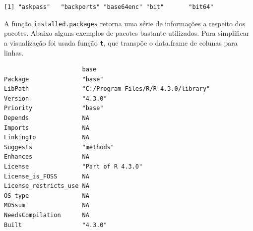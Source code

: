 \documentclass[
  letterpaper,
  DIV=11,
  numbers=noendperiod]{scrreprt}
\newenvironment{Shaded}{\begin{snugshade}}{\end{snugshade}}
\newcommand{\CommentTok}[1]{\textcolor[rgb]{0.37,0.37,0.37}{#1}}
\newcommand{\FunctionTok}[1]{\textcolor[rgb]{0.28,0.35,0.67}{#1}}
\newcommand{\NormalTok}[1]{\textcolor[rgb]{0.00,0.23,0.31}{#1}}
\newcommand{\OtherTok}[1]{\textcolor[rgb]{0.00,0.23,0.31}{#1}}
\newcommand{\SpecialCharTok}[1]{\textcolor[rgb]{0.37,0.37,0.37}{#1}}
\newcommand{\StringTok}[1]{\textcolor[rgb]{0.13,0.47,0.30}{#1}}
\begin{document}
\begin{verbatim}
[1] "askpass"   "backports" "base64enc" "bit"       "bit64"    
\end{verbatim}

A função \texttt{installed.packages} retorna uma série de informações a
respeito dos pacotes. Abaixo alguns exemplos de pacotes bastante
utilizados. Para simplificar a visualização foi usada função \texttt{t},
que transpõe o data.frame de colunas para linhas.

\begin{Shaded}
\end{Shaded}

\begin{verbatim}
                      base                                
Package               "base"                              
LibPath               "C:/Program Files/R/R-4.3.0/library"
Version               "4.3.0"                             
Priority              "base"                              
Depends               NA                                  
Imports               NA                                  
LinkingTo             NA                                  
Suggests              "methods"                           
Enhances              NA                                  
License               "Part of R 4.3.0"                   
License_is_FOSS       NA                                  
License_restricts_use NA                                  
OS_type               NA                                  
MD5sum                NA                                  
NeedsCompilation      NA                                  
Built                 "4.3.0"                             
\end{verbatim}

\begin{Shaded}
\end{Shaded}
\end{document}
